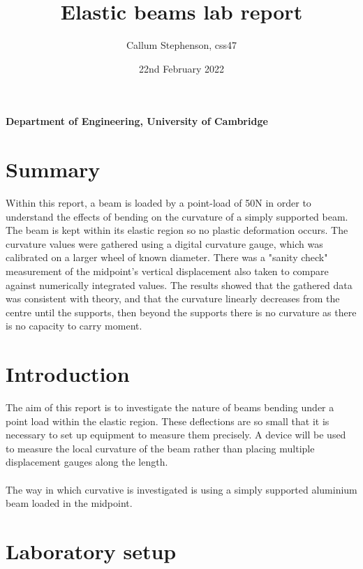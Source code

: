 \documentclass[12pt]{article}
\title{\textbf{Elastic beams lab report}}
\author{Callum Stephenson, css47}
\date{22nd February 2022}
\begin{document}
    \begin{titlepage}
        \maketitle
        \thispagestyle{empty}
        \vspace{13cm}
        \textbf{Department of Engineering, University of Cambridge}
    \end{titlepage}
    \newpage
    \section{Summary}
        Within this report, a beam is loaded by a point-load of 50N in order to understand the effects of bending on the curvature of a simply supported beam. The beam is kept within its elastic region
        so no plastic deformation occurs.
        The curvature values were gathered using a digital curvature gauge, which was calibrated on a larger wheel of known diameter. There was a "sanity check" measurement of the midpoint's vertical displacement
        also taken to compare against numerically integrated values. The results showed that the gathered data was consistent with theory, 
        and that the curvature linearly decreases from the centre until the supports, then beyond the supports there is no curvature as there is no capacity to carry moment. 

    \section{Introduction}
        The aim of this report is to investigate the nature of beams bending under a point load within the elastic region. These deflections are so 
        small that it is necessary to set up equipment to measure them precisely. 
        A device will be used to measure the local curvature of the beam rather than placing multiple displacement gauges along the length. \\ \\
        The way in which curvative is investigated is using a simply supported aluminium beam loaded in the midpoint. 
    \section{Laboratory setup}
\end{document}
